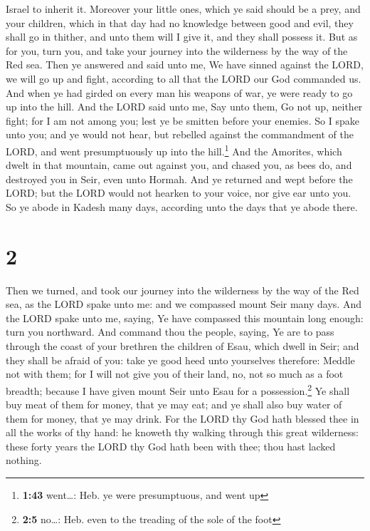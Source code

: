 Israel to inherit it.  Moreover your little ones, which
ye said should be a prey, and your children, which in that day had no
knowledge between good and evil, they shall go in thither, and unto them
will I give it, and they shall possess it.  But as for
you, turn you, and take your journey into the wilderness by the way of
the Red sea.  Then ye answered and said unto me, We have
sinned against the LORD, we will go up and fight, according to all that
the LORD our God commanded us. And when ye had girded on every man his
weapons of war, ye were ready to go up into the hill. 
And the LORD said unto me, Say unto them, Go not up, neither fight; for
I am not among you; lest ye be smitten before your enemies.
 So I spake unto you; and ye would not hear, but rebelled
against the commandment of the LORD, and went presumptuously up into the
hill.\footnote{\textbf{1:43} went\ldots: Heb. ye were presumptuous, and
  went up}  And the Amorites, which dwelt in that
mountain, came out against you, and chased you, as bees do, and
destroyed you in Seir, even unto Hormah.  And ye returned
and wept before the LORD; but the LORD would not hearken to your voice,
nor give ear unto you.  So ye abode in Kadesh many days,
according unto the days that ye abode there.

\hypertarget{section-1}{%
\section{2}\label{section-1}}

 Then we turned, and took our journey into the wilderness
by the way of the Red sea, as the LORD spake unto me: and we compassed
mount Seir many days.  And the LORD spake unto me, saying,
 Ye have compassed this mountain long enough: turn you
northward.  And command thou the people, saying, Ye are to
pass through the coast of your brethren the children of Esau, which
dwell in Seir; and they shall be afraid of you: take ye good heed unto
yourselves therefore:  Meddle not with them; for I will
not give you of their land, no, not so much as a foot breadth; because I
have given mount Seir unto Esau for a possession.\footnote{\textbf{2:5}
  no\ldots: Heb. even to the treading of the sole of the foot}
 Ye shall buy meat of them for money, that ye may eat; and
ye shall also buy water of them for money, that ye may drink.
 For the LORD thy God hath blessed thee in all the works
of thy hand: he knoweth thy walking through this great wilderness: these
forty years the LORD thy God hath been with thee; thou hast lacked
nothing.

